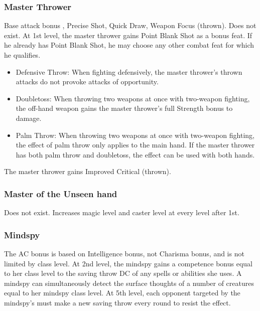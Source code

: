 \subsubsection{Master Thrower}
 Base attack bonus , Precise Shot, Quick Draw, Weapon Focus (thrown).
 Does not exist.
 At 1st level, the master thrower gains Point Blank Shot as a bonus feat. If he already has Point Blank Shot, he may choose any other combat feat for which he qualifies.
\begin{itemize}
\item Defensive Throw: When fighting defensively, the master thrower's thrown attacks do not provoke attacks of opportunity.
\item Doubletoss: When throwing two weapons at once with two-weapon fighting, the off-hand weapon gains the master thrower's full Strength bonus to damage.
\item Palm Throw: When throwing two weapons at once with two-weapon fighting, the effect of palm throw only applies to the main hand. If the master thrower has both palm throw and doubletoss, the effect can be used with both hands.
\end{itemize}
 The master thrower gains Improved Critical (thrown).

\subsubsection{Master of the Unseen hand}
 Does not exist.
 Increases magic level and caster level at every level after 1st.

\subsubsection{Mindspy}
 The AC bonus is based on Intelligence bonus, not Charisma bonus, and is not limited by class level.
 At 2nd level, the mindspy gains a competence bonus equal to her class level to the saving throw DC of any  spells or abilities she uses.
 A mindspy can simultaneously detect the surface thoughts of a number of creatures equal to her mindspy class level.
 At 5th level, each opponent targeted by the mindspy's  must make a new saving throw every round to resist the effect.

